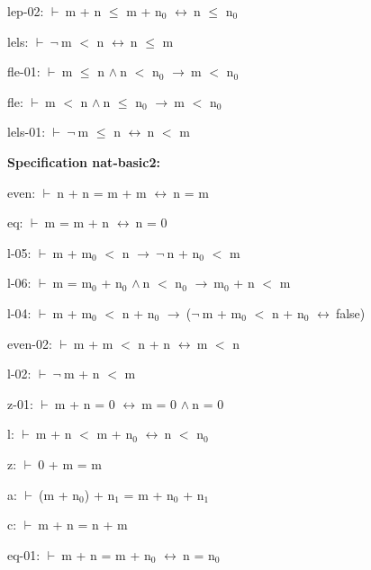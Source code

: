 \documentclass[a4paper]{article}
\newcommand{\Fol}{\mbox{$\vdash\ $}}
\newcommand{\Not}{\mbox{$\neg\ $}}
\newcommand{\And}{\mbox{$\wedge\ $}}
\newcommand{\Imp}{\mbox{$\rightarrow\ $}}
\newcommand{\Equiv}{\mbox{$\leftrightarrow\ $}}
\begin{document}
lep-02: 
 \Fol m + n $\le$ m + $\mbox{n}_{0}$ \Equiv n $\le$ $\mbox{n}_{0}$



lels: 
 \Fol \Not m $<$ n \Equiv n $\le$ m



fle-01: 
 \Fol m $\le$ n \And n $<$ $\mbox{n}_{0}$ \Imp m $<$ $\mbox{n}_{0}$



fle: 
 \Fol m $<$ n \And n $\le$ $\mbox{n}_{0}$ \Imp m $<$ $\mbox{n}_{0}$



lels-01: 
 \Fol \Not m $\le$ n \Equiv n $<$ m



{\bf Specification nat-basic2:}

even: 
 \Fol n + n = m + m \Equiv n = m



eq: 
 \Fol m = m + n \Equiv n = 0



l-05: 
 \Fol m + $\mbox{m}_{0}$ $<$ n \Imp \Not n + $\mbox{n}_{0}$ $<$ m



l-06: 
 \Fol m = $\mbox{m}_{0}$ + $\mbox{n}_{0}$ \And n $<$ $\mbox{n}_{0}$ \Imp $\mbox{m}_{0}$ + n $<$ m



l-04: 
 \Fol m + $\mbox{m}_{0}$ $<$ n + $\mbox{n}_{0}$ \Imp (\Not m + $\mbox{m}_{0}$ $<$ n + $\mbox{n}_{0}$ \Equiv false)



even-02: 
 \Fol m + m $<$ n + n \Equiv m $<$ n



l-02: 
 \Fol \Not m + n $<$ m



z-01: 
 \Fol m + n = 0 \Equiv m = 0 \And n = 0



l: 
 \Fol m + n $<$ m + $\mbox{n}_{0}$ \Equiv n $<$ $\mbox{n}_{0}$



z: 
 \Fol 0 + m = m



a: 
 \Fol (m + $\mbox{n}_{0}$) + $\mbox{n}_{1}$ = m + $\mbox{n}_{0}$ + $\mbox{n}_{1}$



c: 
 \Fol m + n = n + m



eq-01: 
 \Fol m + n = m + $\mbox{n}_{0}$ \Equiv n = $\mbox{n}_{0}$
\end{document}
